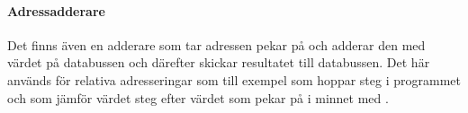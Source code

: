 \documentclass[main.tex]{subfiles}
\begin{document}
\paragraph{Adressadderare}
Det finns även en adderare som tar adressen  pekar på och adderar
den med värdet på databussen och därefter skickar resultatet till databussen.
Det här används för relativa adresseringar som till exempel  som
hoppar  steg i programmet och  som jämför värdet
 steg efter värdet som  pekar på i minnet med .

\end{document}
